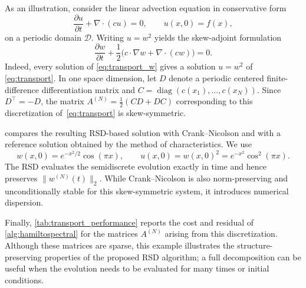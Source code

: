 \documentclass[final,onefignum,onetabnum,dvipsnames]{siamart251216}
\numberwithin{algorithm}{section}
\numberwithin{equation}{section}
\DeclareMathOperator{\diag}{diag}
\begin{document}
As an illustration, consider the linear advection equation in
conservative form
\begin{equation}\label{eq:transport}
    \frac{\partial u}{\partial t}
    +\nabla\cdot(cu)=0,
    \qquad
    u(x,0)=f(x),
\end{equation}
on a periodic domain $\mathcal D$. Writing $u=w^2$ yields the
skew-adjoint formulation
\begin{equation}\label{eq:transport_w}
    \frac{\partial w}{\partial t}
    +\frac12\bigl(c\cdot\nabla w+\nabla\cdot(cw)\bigr)=0.
\end{equation}
Indeed, every solution of \eqref{eq:transport_w} gives a solution
$u=w^2$ of \eqref{eq:transport}. In one space dimension, let $D$
denote a periodic centered finite-difference differentiation matrix and
$C=\diag(c(x_1),\ldots,c(x_N))$. Since $D^\top=-D$, the matrix
$
    A^{(N)}=\frac12(CD+DC)
$
corresponding to this discretization of~\eqref{eq:transport} is skew-symmetric.

 compares the resulting RSD-based solution with
Crank--Nicolson and with a reference solution obtained by the method of
characteristics. We use
\[
    w(x,0)=e^{-x^2/2}\cos(\pi x),
    \qquad
    u(x,0)=w(x,0)^2=e^{-x^2}\cos^2(\pi x).
\]
The RSD evaluates the semidiscrete evolution exactly in time and hence
preserves $\|w^{(N)}(t)\|_2$. While Crank--Nicolson is also norm-preserving
and unconditionally stable for this skew-symmetric system, it 
introduces numerical dispersion.

Finally, \cref{tab:transport_performance} reports the cost and
residual of \cref{alg:hamiltospectral} for the matrices
$A^{(N)}$ arising from this discretization. Although these matrices are
sparse, this example illustrates the structure-preserving properties
of the proposed RSD algorithm; a full decomposition can be useful when
the evolution needs to be evaluated for many times or initial
conditions.
\end{document}
